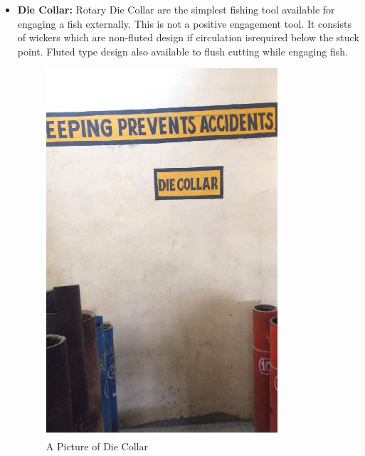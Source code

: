 \begin{itemize}
\item \textbf{Die Collar:} Rotary Die Collar are the simplest fishing tool available
for engaging a fish externally. This is not a positive engagement tool.
It consists of wickers which are non-fluted design if circulation isrequired below the stuck point. Fluted type design also available to
flush cutting while engaging fish.

\begin{figure}[H]
\includegraphics[scale=0.3]{images/Die_collar}
\centering 
\caption{A Picture of Die Collar}
\end{figure}

\end{itemize}



